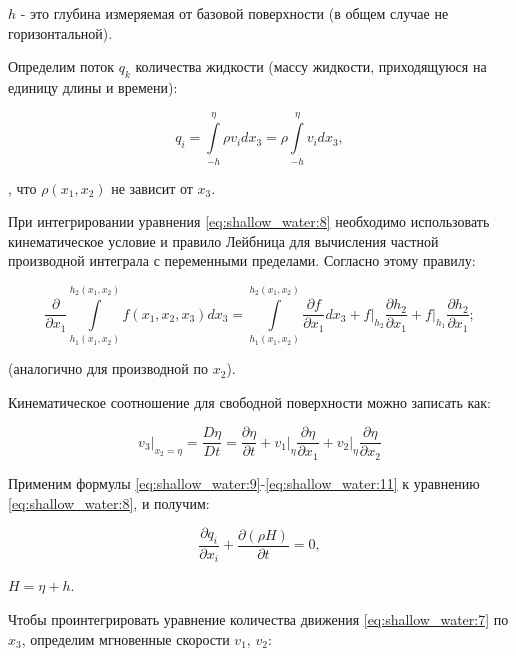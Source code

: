 \documentclass[14pt]{extreport}
\begin{document}
 $h$ - это глубина измеряемая от базовой поверхности (в общем случае не горизонтальной).

Определим поток $q_k$ количества жидкости (массу жидкости, приходящуюся на единицу длины и времени):


\begin{equation}\label{eq:shallow_water:9}
q_i = \int\limits^\eta_{-h} \rho v_i dx_3 = \rho \int\limits^\eta_{-h} v_i dx_3,
\end{equation}

, что $\rho(x_1, x_2)$ не зависит от $x_3$.

При интегрировании уравнения \ref{eq:shallow_water:8} необходимо использовать кинематическое условие и правило Лейбница \cite{bib:calc:zorich} для вычисления частной производной интеграла с переменными пределами. Согласно этому правилу:


\begin{equation}\label{eq:shallow_water:10}
\frac{\partial}{\partial x_1} \int\limits^{h_2(x_1,x_2)}_{h_1(x_1,x_2)} f(x_1, x_2, x_3) dx_3=\int\limits^{h_2(x_1,x_2)}_{h_1(x_1,x_2)} \frac{\partial f}{\partial x_1} dx_3 + f \bigg|_{h_2}  \frac{\partial h_2}{\partial x_1} + f \bigg|_{h_1} \frac{\partial h_2}{\partial x_1};
\end{equation}

\noindent(аналогично для производной по $x_2$).

Кинематическое соотношение для свободной поверхности можно записать как:

\begin{equation}\label{eq:shallow_water:11}
v_3\bigg|_{x_2=\eta} = \frac{D\eta}{Dt} = \frac{\partial \eta}{\partial t} + v_1 \bigg|_{\eta} \frac{\partial \eta}{\partial x_1} + v_2 \bigg|_{\eta}\frac{\partial \eta}{\partial x_2}
\end{equation}

Применим формулы \ref{eq:shallow_water:9}-\ref{eq:shallow_water:11} к уравнению \ref{eq:shallow_water:8}, и получим:

\begin{equation}\label{eq:shallow_water:12}
\frac{ \partial q_i}{\partial x_i} + \frac{\partial(\rho H)}{\partial t} = 0,
\end{equation}

 $H=\eta+h$.

Чтобы проинтегрировать уравнение количества движения \ref{eq:shallow_water:7} по $x_3$, определим мгновенные скорости $v_1$, $v_2$:
\end{document}
